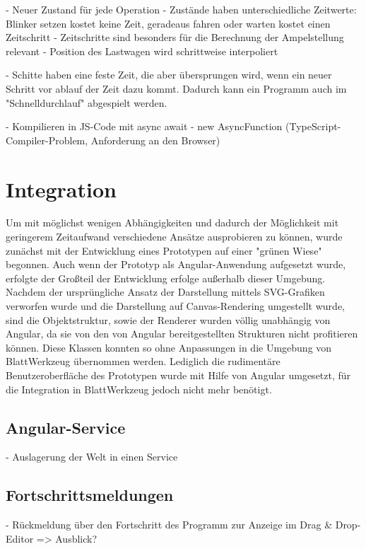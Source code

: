 - Neuer Zustand für jede Operation
- Zustände haben unterschiedliche Zeitwerte: Blinker setzen kostet keine Zeit,
  geradeaus fahren oder warten kostet einen Zeitschritt
- Zeitschritte sind besonders für die Berechnung der Ampelstellung relevant
- Position des Lastwagen wird schrittweise interpoliert

- Schitte haben eine feste Zeit, die aber übersprungen wird, wenn ein neuer
  Schritt vor ablauf der Zeit dazu kommt. Dadurch kann ein Programm auch im
  "Schnelldurchlauf" abgespielt werden.

- Kompilieren in JS-Code mit async await
- new AsyncFunction (TypeScript-Compiler-Problem, Anforderung an den Browser)

\section{Integration}

Um mit möglichst wenigen Abhängigkeiten und dadurch der Möglichkeit mit geringerem Zeitaufwand verschiedene Ansätze ausprobieren zu können, wurde zunächst mit der Entwicklung eines Prototypen auf einer "grünen Wiese" begonnen. Auch wenn der Prototyp als Angular-Anwendung aufgesetzt wurde, erfolgte der Großteil der Entwicklung erfolge außerhalb dieser Umgebung. Nachdem der ursprüngliche Ansatz der Darstellung mittels SVG-Grafiken verworfen wurde und die Darstellung auf Canvas-Rendering umgestellt wurde, sind die Objektstruktur, sowie der Renderer wurden völlig unabhängig von Angular, da sie von den von Angular bereitgestellten Strukturen nicht profitieren können. Diese Klassen konnten so ohne Anpassungen in die Umgebung von BlattWerkzeug übernommen werden. Lediglich die rudimentäre Benutzeroberfläche des Prototypen  wurde mit Hilfe von Angular umgesetzt, für die Integration in BlattWerkzeug jedoch nicht mehr benötigt.

\subsection{Angular-Service}

- Auslagerung der Welt in einen Service

\subsection{Fortschrittsmeldungen}

- Rückmeldung über den Fortschritt des Programm zur Anzeige im Drag \& Drop-Editor => Ausblick?
